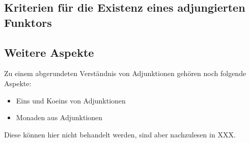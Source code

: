 \subsection{Kriterien für die Existenz eines adjungierten Funktors}


\subsection{Weitere Aspekte}

Zu einem abgerundeten Verständnis von Adjunktionen gehören noch folgende
Aspekte:
\begin{itemize}
\item Eins und Koeins von Adjunktionen
\item Monaden aus Adjunktionen
\end{itemize}
Diese können hier nicht behandelt werden, sind aber nachzulesen in XXX.


\endinput
\begin{exmp}
$\cC=Grp$, $\cD=Grp^2=Grp\times Grp$
\begin{align*}
F: & Grp^2\rightarrow Grp &\mbox{Produktfunktor}\\
  & (G_1,G_2) \mapsto G_1\times G_2\\
G: & Grp \rightarrow Grp^2 &\mbox{Diagonalfunktor}\\
  & G \mapsto (G,G)
\end{align*}
\paragraph{Beh:} $F\vdash G$
\[
\Hom_{Grp^2}((G,G),(H_1,H_2))\cong \Hom_{Grp}(G,H_1\times H_2)
\]
wobei
\begin{itemize}
\item $\Hom_{Grp^2}((G,G),(H_1,H_2))=\{\mbox{Gruppen-Homomorphismen}\}$
\item $ \Hom_{Grp}(G,H_1\times H_2) =\{G\rightarrow H_1\times H_2 \mbox{
Gruppen-Homomorphismen}\}$
\end{itemize}
\end{exmp}
\endinput


